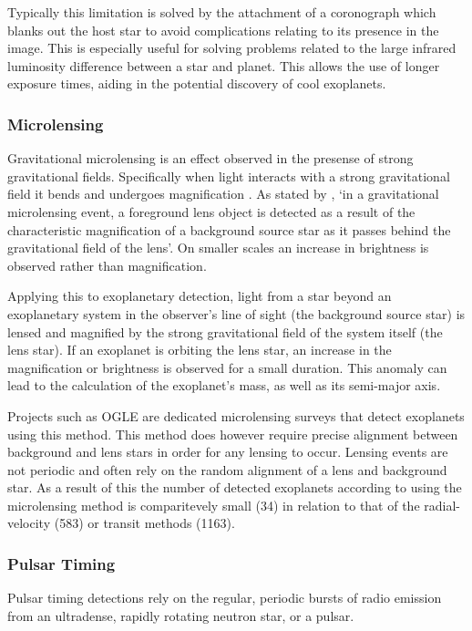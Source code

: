 \documentclass[twoside,4pt]{article}
\begin{document}
\begin{multicols}{2}
Typically this limitation is solved by the attachment of a coronograph which blanks out the host star to avoid complications relating to its presence in the image. This is especially useful for solving problems related to the large infrared luminosity difference between a star and planet. This allows the use of longer exposure times, aiding in the potential discovery of cool exoplanets. 

\subsubsection{Microlensing }
Gravitational microlensing is an effect observed in the presense of strong gravitational fields. Specifically when light interacts with a strong gravitational field it bends and undergoes magnification \parencite{einstein}. As stated by \textcite{micro}, `in a gravitational microlensing event, a foreground lens object is detected as a result of the characteristic magnification of a background source star as it passes behind the gravitational field of the lens'. On smaller scales an increase in brightness is observed rather than magnification.

Applying this to exoplanetary detection, light from a star beyond an exoplanetary system in the observer's line of sight (the background source star) is lensed and magnified by the strong gravitational field of the system itself (the lens star). If an exoplanet is orbiting the lens star, an increase in the magnification or brightness is observed for a small duration. This anomaly can lead to the calculation of the exoplanet's mass, as well as its semi-major axis.

Projects such as OGLE are dedicated microlensing surveys that detect exoplanets using this method. This method does however require precise alignment between background and lens stars in order for any lensing to occur. Lensing events are not periodic and often rely on the random alignment of a lens and background star. As a result of this the number of detected exoplanets according to \textcite{exo} using the microlensing method is comparitevely small (34) in relation to that of the radial-velocity (583) or transit methods (1163). 

\subsubsection{Pulsar Timing}
Pulsar timing detections rely on the regular, periodic bursts of radio emission from an ultradense, rapidly rotating neutron star, or a pulsar.


\end{multicols}
\end{document}
